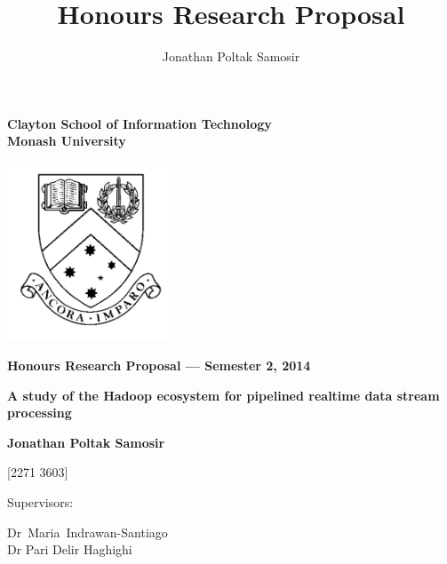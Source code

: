 \documentclass[a4paper,11pt]{article}
\author{Jonathan Poltak Samosir}
\title{Honours Research Proposal}
\begin{document}
\thispagestyle{empty} %
\renewcommand{\thepage}{\roman{page}}

\begin{spacing}{1.5}
\begin{center}
{\Large \bfseries
Clayton School of Information Technology\\
Monash University}

\vspace*{30mm}

\includegraphics[width=5cm]{img/MonashCrest.pdf}

\vspace*{15mm}

{\large \bfseries
Honours Research Proposal --- Semester 2, 2014
}

\vspace*{10mm}

{\LARGE \bfseries
A study of the Hadoop ecosystem for pipelined realtime data stream processing
}

\vspace*{20mm}

{\large \bfseries
Jonathan Poltak Samosir

[2271 3603]

\vspace*{20mm}

Supervisors: \parbox[t]{50mm}{\mbox{Dr Maria Indrawan-Santiago}\\Dr Pari Delir Haghighi}
}

\end{center}
\end{spacing}

\newpage

\tableofcontents

\newpage
\setcounter{page}{1}
\renewcommand{\thepage}{\arabic{page}}
\end{document}
